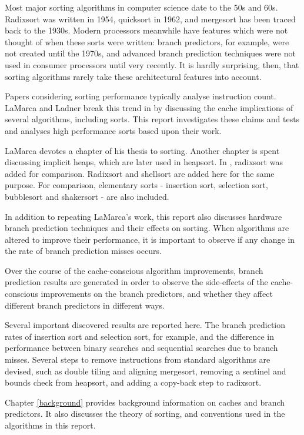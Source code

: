 \label{intro}
Most major sorting algorithms in computer science date to the 50s and 60s.
Radixsort was written in 1954, quicksort in 1962, and mergesort has been traced
back to the 1930s. Modern processors meanwhile have features which were not
thought of when these sorts were written: branch predictors, for example, were
not created until the 1970s, and advanced branch prediction techniques were not
used in consumer processors until very recently. It is hardly surprising, then,
that sorting algorithms rarely take these architectural features into account.

Papers considering sorting performance typically analyse instruction count.
LaMarca and Ladner break this trend in \cite{LaMarca96} by discussing the cache
implications of several algorithms, including sorts. This report investigates
these claims and tests and analyses high performance sorts based upon their
work.

LaMarca devotes a chapter of his thesis to sorting. Another chapter is spent
discussing implicit heaps, which are later used in heapsort. In
\cite{LaMarca99}, radixsort was added for comparison. Radixsort and shellsort
are added here for the same purpose. For comparison, elementary sorts -
insertion sort, selection sort, bubblesort and shakersort - are also included.


In addition to repeating LaMarca's work, this report also discusses hardware
branch prediction techniques and their effects on sorting. When algorithms are
altered to improve their performance, it is important to observe if any change
in the rate of branch prediction misses occurs.

Over the course of the cache-conscious algorithm improvements, branch prediction
results are generated in order to observe the side-effects of the
cache-conscious improvements on the branch predictors, and whether they affect
different branch predictors in different ways. 

Several important discovered results are reported here. The branch prediction
rates of insertion sort and selection sort, for example, and the difference in
performance between binary searches and sequential searches due to branch
misses. Several steps to remove instructions from standard algorithms are
devised, such as double tiling and aligning mergesort, removing a sentinel and
bounds check from heapsort, and adding a copy-back step to radixsort.


Chapter \ref{background} provides background information on caches and branch
predictors. It also discusses the theory of sorting, and conventions used in the
algorithms in this report.

